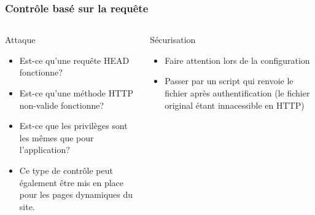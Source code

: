 \documentclass[aspectratio=169]{beamer}  %
\begin{document}
\begin{frame}
  \frametitle{Contrôle basé sur la requête}
  \begin{columns}[T]
      \begin{alertblock}{Attaque}
        \begin{itemize}
          \item Est-ce qu'une requête HEAD fonctionne?
          \item Est-ce qu'une méthode HTTP non-valide fonctionne?
          \item Est-ce que les privilèges sont les mêmes que pour l'application?
          \item Ce type de contrôle peut également être mis en place pour les pages dynamiques du site.
        \end{itemize}
      \end{alertblock}
      \begin{exampleblock}{Sécurisation}
        \begin{itemize}
          \item Faire attention lors de la configuration
          \item Passer par un script qui renvoie le fichier après authentification (le fichier original étant innacessible en HTTP)
        \end{itemize}
      \end{exampleblock}
  \end{columns}
\end{frame}
\end{document}
